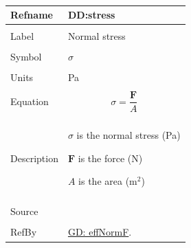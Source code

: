 \documentclass[12pt]{article}
\begin{document}
~\newline
 \noindent \begin{minipage}{\textwidth}
\begin{tabular}{p{} p{}}
\toprule \textbf{Refname} & \textbf{DD:stress}
\label{DD:stress}
\\ \midrule \\
Label & Normal stress
        \\ \midrule \\
        Symbol & $σ$
                 \\ \midrule \\
                 Units & Pa
                         \\ \midrule \\
                         Equation & \begin{displaymath}
                                    σ=\frac{\mathbf{F}}{A}
                                    \end{displaymath}
                                    \\ \midrule \\
                                    Description & \begin{symbDescription}
                                                  \item{$σ$ is the normal stress (Pa)}
                                                  \item{$\mathbf{F}$ is the force (N)}
                                                  \item{$A$ is the area ($\text{m}^{2}$)}
                                                  \end{symbDescription}
                                                  \\ \midrule \\
                                                  Source & \cite{huston2008}
                                                           \\ \midrule \\
                                                           RefBy & \hyperref[GD:effNormF]{GD: effNormF}.
\\ \bottomrule \end{tabular}
\end{minipage}\\
~\newline
\end{document}
